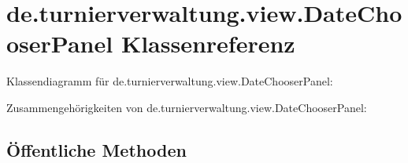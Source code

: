 \hypertarget{classde_1_1turnierverwaltung_1_1view_1_1_date_chooser_panel}{}\section{de.\+turnierverwaltung.\+view.\+Date\+Chooser\+Panel Klassenreferenz}
\label{classde_1_1turnierverwaltung_1_1view_1_1_date_chooser_panel}


Klassendiagramm für de.\+turnierverwaltung.\+view.\+Date\+Chooser\+Panel\+:


Zusammengehörigkeiten von de.\+turnierverwaltung.\+view.\+Date\+Chooser\+Panel\+:
\subsection*{Öffentliche Methoden}
